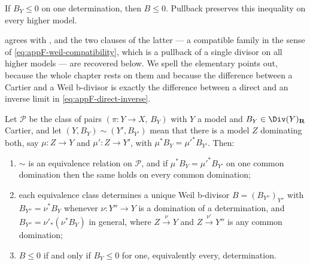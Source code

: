 If $B_Y\le0$ on one determination, then $B\le0$.  Pullback preserves
this inequality on every higher model.

 agrees with
, and the two clauses of the latter --- a
compatible family in the sense of \eqref{eq:appF-weil-compatibility}, which
is a pullback of a single divisor on all higher models --- are recovered
below.  We spell the elementary points out, because the whole chapter rests
on them and because the difference between a Cartier and a Weil b-divisor
is exactly the difference between a direct and an inverse limit in
\eqref{eq:appF-direct-inverse}.

\begin{lemma}
\label{lem:ch38-determination-equivalence}
Let $\mathcal P$ be the class of pairs $(\pi:Y\to X,\,B_Y)$ with $Y$
a model and $B_Y\in\Div(Y)_{\mathbf R}$ Cartier, and let
$(Y,B_Y)\sim(Y',B_{Y'})$ mean that there is a model $Z$ dominating both,
say $\mu:Z\to Y$ and $\mu':Z\to Y'$, with
$\mu^*B_Y=\mu'^*B_{Y'}$.  Then:
\begin{enumerate}
\item\label{itm:ch38-de:equiv} $\sim$ is an equivalence relation on
 $\mathcal P$, and if $\mu^*B_Y=\mu'^*B_{Y'}$ on one common domination
 then the same holds on every common domination;
\item\label{itm:ch38-de:family} each equivalence class determines a unique
 Weil b-divisor $B=(B_{Y''})_{Y''}$ with
 $B_{Y''}=\nu^*B_Y$ whenever $\nu:Y''\to Y$ is a domination of a
 determination, and $B_{Y''}=\nu'_*(\nu^*B_Y)$ in general, where
 $Z\xrightarrow{\nu}Y$ and $Z\xrightarrow{\nu'}Y''$ is any common
 domination;
\item\label{itm:ch38-de:order} $B\leq0$ if and only if $B_Y\leq0$ for
 one, equivalently every, determination.
\end{enumerate}
\end{lemma}

